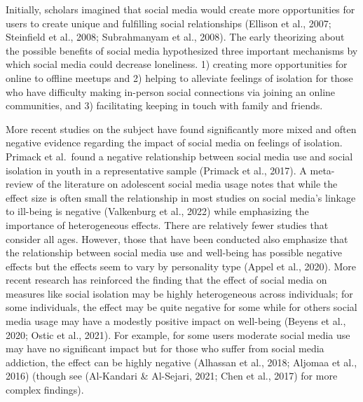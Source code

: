 \documentclass[]{interact}
\theoremstyle{plain}%
\theoremstyle{definition}
\theoremstyle{remark}
\begin{document}
Initially, scholars imagined that social media would create more
opportunities for users to create unique and fulfilling social
relationships (Ellison et al., 2007; Steinfield et al., 2008;
Subrahmanyam et al., 2008). The early theorizing about the possible
benefits of social media hypothesized three important mechanisms by
which social media could decrease loneliness. 1) creating more
opportunities for online to offline meetups and 2) helping to alleviate
feelings of isolation for those who have difficulty making in-person
social connections via joining an online communities, and 3)
facilitating keeping in touch with family and friends.

More recent studies on the subject have found significantly more mixed
and often negative evidence regarding the impact of social media on
feelings of isolation. Primack et al.~found a negative relationship
between social media use and social isolation in youth in a
representative sample (Primack et al., 2017). A meta-review of the
literature on adolescent social media usage notes that while the effect
size is often small the relationship in most studies on social media's
linkage to ill-being is negative (Valkenburg et al., 2022) while
emphasizing the importance of heterogeneous effects. There are
relatively fewer studies that consider all ages. However, those that
have been conducted also emphasize that the relationship between social
media use and well-being has possible negative effects but the effects
seem to vary by personality type (Appel et al., 2020). More recent
research has reinforced the finding that the effect of social media on
measures like social isolation may be highly heterogeneous across
individuals; for some individuals, the effect may be quite negative for
some while for others social media usage may have a modestly positive
impact on well-being (Beyens et al., 2020; Ostic et al., 2021). For
example, for some users moderate social media use may have no
significant impact but for those who suffer from social media addiction,
the effect can be highly negative (Alhassan et al., 2018; Aljomaa et
al., 2016) (though see (Al-Kandari \& Al-Sejari, 2021; Chen et al.,
2017) for more complex findings).
\end{document}
